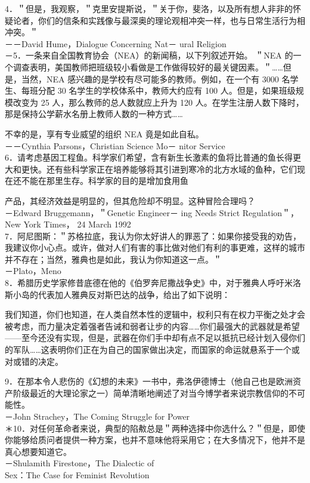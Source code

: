 4．＂但是，我观察，＂克里安提斯说，＂关于你，斐洛，以及所有想人非非的怀疑论者，你们的信条和实践像与最深奥的理论观相冲突一样，也与日常生活行为相冲突。＂\\
－－David Hume，Dialogue Concerning Nat－ ural Religion\\
－5．一条来自全国教育协会（NEA）的新闻稿，以下列叙述开始。 ＂NEA 的一个调查表明，美国教师把班级较小看做是工作做得较好的最关键因素。＂……但是，当然，NEA 感兴趣的是学校有尽可能多的教师。例如，在一个有 3000 名学生、每班分配 30 名学生的学校体系中，教师大约应有 100 人。但是，如果班级规模改变为 25 人，那么教师的总人数就应上升为 120 人。在学生注册人数下降时，那是保持公学薪水名册上教师人数的一种方式……

不幸的是，享有专业威望的组织 NEA 竟是如此自私。\\
－－Cynthia Parsons，Christian Science Mo－ nitor Service\\
6．请考虑基因工程鱼。科学家们希望，含有新生长激素的鱼将比普通的鱼长得更大和更快。还有些科学家正在培养能够将其引进到寒冷的北方水域的鱼种，它们现在还不能在那里生存。科学家的目的是增加食用鱼

产品，其经济效益是明显的，但其危险却不明显。这种冒险合理吗？\\
－Edward Bruggemann，＂Genetic Engineer－ ing Needs Strict Regulation＂，New York Times， 24 March 1992\\
7．阿尼图斯：＂苏格拉底，我认为你太好讲人的罪恶了：如果你接受我的劝告，我建议你小心点。或许，做对人们有害的事比做对他们有利的事更难，这样的城市并不存在；当然，雅典也是如此，我认为你知道这一点。＂\\
－Plato，Meno\\
8．希腊历史学家修昔底德在他的《伯罗奔尼撒战争史》中，对于雅典人呼吁米洛斯小岛的代表加人雅典反对斯巴达的战争，给出了如下说明：

我们知道，你们也知道，在人类自然本性的逻辑中，权利只有在权力平衡之处才会被考虑，而力量决定着强者告诫和弱者让步的内容……你们最强大的武器就是希望——至今还没有实现，但是，武器在你们手中却有点不足以抵抗已经计划入侵你们的军队……这表明你们正在为自己的国家做出决定，而国家的命运就悬系于一个或对或错的决定。

9．在那本令人悲伤的《幻想的未来》一书中，弗洛伊德博士（他自己也是欧洲资产阶级最近的大理论家之一）简单清晰地阐述了对当今博学者来说宗教信仰的不可能性。\\
－John Strachey，The Coming Struggle for Power\\
＊10．对任何革命者来说，典型的陷㪄总是＂两种选择中你选什么？＂但是，即使你能够给质问者提供一种方案，也并不意味他将采用它；在大多情况下，他并不是真心想要知道它。\\
－Shulamith Firestone，The Dialectic of\\
Sex：The Case for Feminist Revolution

